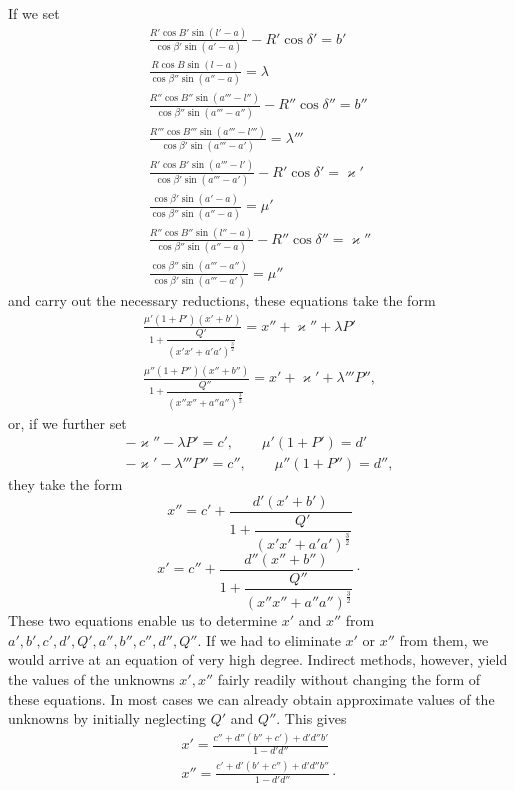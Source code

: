 If we set
\[
\begin{gathered}
\frac{R'\cos B'\sin(l'-a)}{\cos\beta'\sin(a'-a)}-R'\cos\delta'=b'\\[.7em]
\frac{R\cos B\sin(l-a)}{\cos\beta''\sin(a''-a)}=\lambda\\[.7em]
\frac{R''\cos B''\sin(a'''-l'')}{\cos\beta''\sin(a'''-a'')}-R''\cos\delta''=b''\\[.7em]
\frac{R'''\cos B'''\sin(a'''-l''')}{\cos\beta'\sin(a'''-a')}=\lambda'''\\[.7em]
\frac{R'\cos B'\sin(a'''-l')}{\cos\beta'\sin(a'''-a')}-R'\cos\delta'=\varkappa'\\[.7em]
\frac{\cos\beta'\sin(a'-a)}{\cos\beta''\sin(a''-a)}=\mu'\\[.7em]
\frac{R''\cos B''\sin(l''-a)}{\cos\beta''\sin(a''-a)}-R''\cos\delta''=\varkappa''\\[.7em]
\frac{\cos\beta''\sin(a'''-a'')}{\cos\beta'\sin(a'''-a')}=\mu''
\end{gathered}
\]
and carry out the necessary reductions, these equations take the form
\[
\begin{gathered}
\frac{\mu'(1+P')(x'+b')}{1+\dfrac{Q'}{(x'x'+a'a')^{\frac32}}}=x''+\varkappa''+\lambda P'\\[1em]
\frac{\mu''(1+P'')(x''+b'')}{1+\dfrac{Q''}{(x''x''+a''a'')^{\frac32}}}=x'+\varkappa'+\lambda'''P'',
\end{gathered}
\]
or, if we further set
\[
\begin{gathered}
-\varkappa''-\lambda P'=c',\qquad\mu'(1+P')=d'\\[.5em]
-\varkappa'-\lambda'''P''=c'',\qquad\mu''(1+P'')=d'',
\end{gathered}
\]
they take the form
\[
\tag*{I.}x''=c'+\frac{d'(x'+b')}{1+\dfrac{Q'}{(x'x'+a'a')^{\frac32}}}
\]
\[
\tag*{II.}x'=c''+\frac{d''(x''+b'')}{1+\dfrac{Q''}{(x''x''+a''a'')^{\frac32}}}\mathpunct{\cdot}
\]
These two equations enable us to determine $x'$ and $x''$ from \newline $a',b',c',d',Q',a'',b'',c'',d'',Q''$. If we had to eliminate $x'$ or $x''$ from them, we would arrive at an equation of very high degree\HistoricalNoteEight{Manuscript note:] of degree $64^{\mathrm{ti}}$.}. Indirect methods, however, yield the values of the unknowns $x',x''$ fairly readily without changing the form of these equations. In most cases we can already obtain approximate values of the unknowns by initially neglecting $Q'$ and $Q''$. This gives
\[
\begin{gathered}
x'=\frac{c''+d''(b''+c')+d'd''b'}{1-d'd''}\\[.6em]
x''=\frac{c'+d'(b'+c'')+d'd''b''}{1-d'd''}\mathpunct{\cdot}
\end{gathered}
\]
